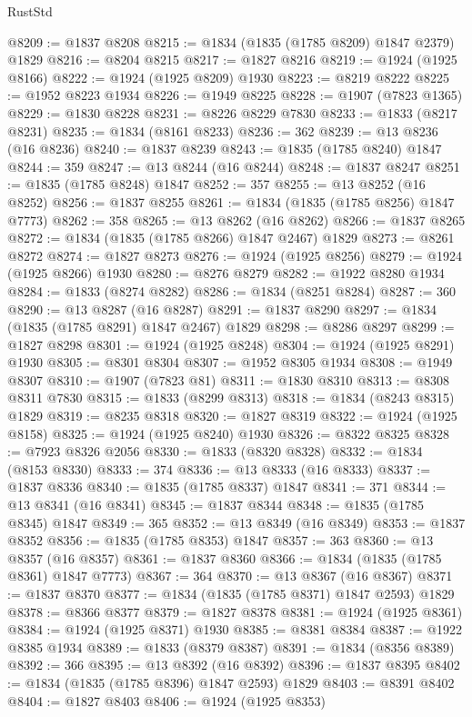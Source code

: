 \begin{lexlean}{RustStd}
\begin{coremodule}
{\begin{coremodule}
{{{{{@8209 := @1837 @8208
@8215 := @1834 (@1835 (@1785 @8209) @1847 @2379) @1829
@8216 := @8204 @8215
@8217 := @1827 @8216
@8219 := @1924 (@1925 @8166)
@8222 := @1924 (@1925 @8209) @1930
@8223 := @8219 @8222
@8225 := @1952 @8223 @1934
@8226 := @1949 @8225
@8228 := @1907 (@7823 @1365)
@8229 := @1830 @8228
@8231 := @8226 @8229 @7830
@8233 := @1833 (@8217 @8231)
@8235 := @1834 (@8161 @8233)
@8236 := 362
@8239 := @13 @8236 (@16 @8236)
@8240 := @1837 @8239
@8243 := @1835 (@1785 @8240) @1847
@8244 := 359
@8247 := @13 @8244 (@16 @8244)
@8248 := @1837 @8247
@8251 := @1835 (@1785 @8248) @1847
@8252 := 357
@8255 := @13 @8252 (@16 @8252)
@8256 := @1837 @8255
@8261 := @1834 (@1835 (@1785 @8256) @1847 @7773)
@8262 := 358
@8265 := @13 @8262 (@16 @8262)
@8266 := @1837 @8265
@8272 := @1834 (@1835 (@1785 @8266) @1847 @2467) @1829
@8273 := @8261 @8272
@8274 := @1827 @8273
@8276 := @1924 (@1925 @8256)
@8279 := @1924 (@1925 @8266) @1930
@8280 := @8276 @8279
@8282 := @1922 @8280 @1934
@8284 := @1833 (@8274 @8282)
@8286 := @1834 (@8251 @8284)
@8287 := 360
@8290 := @13 @8287 (@16 @8287)
@8291 := @1837 @8290
@8297 := @1834 (@1835 (@1785 @8291) @1847 @2467) @1829
@8298 := @8286 @8297
@8299 := @1827 @8298
@8301 := @1924 (@1925 @8248)
@8304 := @1924 (@1925 @8291) @1930
@8305 := @8301 @8304
@8307 := @1952 @8305 @1934
@8308 := @1949 @8307
@8310 := @1907 (@7823 @81)
@8311 := @1830 @8310
@8313 := @8308 @8311 @7830
@8315 := @1833 (@8299 @8313)
@8318 := @1834 (@8243 @8315) @1829
@8319 := @8235 @8318
@8320 := @1827 @8319
@8322 := @1924 (@1925 @8158)
@8325 := @1924 (@1925 @8240) @1930
@8326 := @8322 @8325
@8328 := @7923 @8326 @2056
@8330 := @1833 (@8320 @8328)
@8332 := @1834 (@8153 @8330)
@8333 := 374
@8336 := @13 @8333 (@16 @8333)
@8337 := @1837 @8336
@8340 := @1835 (@1785 @8337) @1847
@8341 := 371
@8344 := @13 @8341 (@16 @8341)
@8345 := @1837 @8344
@8348 := @1835 (@1785 @8345) @1847
@8349 := 365
@8352 := @13 @8349 (@16 @8349)
@8353 := @1837 @8352
@8356 := @1835 (@1785 @8353) @1847
@8357 := 363
@8360 := @13 @8357 (@16 @8357)
@8361 := @1837 @8360
@8366 := @1834 (@1835 (@1785 @8361) @1847 @7773)
@8367 := 364
@8370 := @13 @8367 (@16 @8367)
@8371 := @1837 @8370
@8377 := @1834 (@1835 (@1785 @8371) @1847 @2593) @1829
@8378 := @8366 @8377
@8379 := @1827 @8378
@8381 := @1924 (@1925 @8361)
@8384 := @1924 (@1925 @8371) @1930
@8385 := @8381 @8384
@8387 := @1922 @8385 @1934
@8389 := @1833 (@8379 @8387)
@8391 := @1834 (@8356 @8389)
@8392 := 366
@8395 := @13 @8392 (@16 @8392)
@8396 := @1837 @8395
@8402 := @1834 (@1835 (@1785 @8396) @1847 @2593) @1829
@8403 := @8391 @8402
@8404 := @1827 @8403
@8406 := @1924 (@1925 @8353)
}}}}}
\end{coremodule}}
\end{coremodule}
\end{lexlean}
